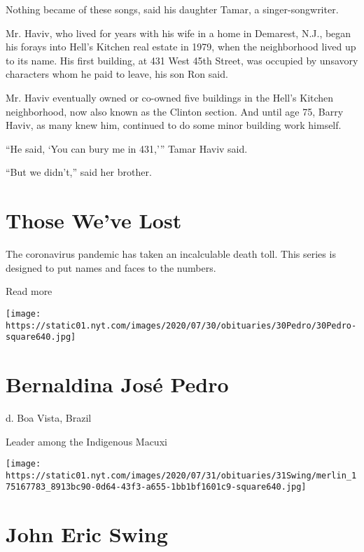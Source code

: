 Nothing became of these songs, said his daughter Tamar, a
singer-songwriter.

Mr. Haviv, who lived for years with his wife in a home in Demarest,
N.J., began his forays into Hell's Kitchen real estate in 1979, when the
neighborhood lived up to its name. His first building, at 431 West 45th
Street, was occupied by unsavory characters whom he paid to leave, his
son Ron said.

Mr. Haviv eventually owned or co-owned five buildings in the Hell's
Kitchen neighborhood, now also known as the Clinton section. And until
age 75, Barry Haviv, as many knew him, continued to do some minor
building work himself.

``He said, `You can bury me in 431,''' Tamar Haviv said.

``But we didn't,'' said her brother.

\href{https://www.nytimes.com/interactive/2020/obituaries/people-died-coronavirus-obituaries.html?action=click\&pgtype=Article\&state=default\&region=BELOW_MAIN_CONTENT\&context=covid_obits_promo}{}

\hypertarget{those-weve-lost}{%
\section{Those We've Lost}\label{those-weve-lost}}

The coronavirus pandemic has taken an incalculable death toll. This
series is designed to put names and faces to the numbers.

Read more

\texttt{[image: https://static01.nyt.com/images/2020/07/30/obituaries/30Pedro/30Pedro-square640.jpg]}

\hypertarget{bernaldina-josuxe9-pedro}{%
\section{Bernaldina José Pedro}\label{bernaldina-josuxe9-pedro}}

d. Boa Vista, Brazil

Leader among the Indigenous Macuxi

\texttt{[image: https://static01.nyt.com/images/2020/07/31/obituaries/31Swing/merlin\_175167783\_8913bc90-0d64-43f3-a655-1bb1bf1601c9-square640.jpg]}

\hypertarget{john-eric-swing}{%
\section{John Eric Swing}\label{john-eric-swing}}

